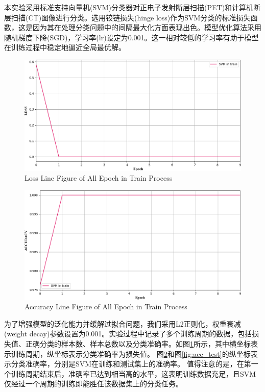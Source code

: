 \documentclass[twocolumn]{article}
\begin{document}
本实验采用标准支持向量机(SVM)分类器对正电子发射断层扫描(PET)和计算机断层扫描(CT)图像进行分类。选用铰链损失(hinge loss)作为SVM分类的标准损失函数，这是因为其在处理分类问题中的间隔最大化方面表现出色。模型优化算法采用随机梯度下降(SGD)，学习率(lr)设定为0.001。这一相对较低的学习率有助于模型在训练过程中稳定地逼近全局最优解。

\begin{figure}[h]
    \centering
    \includegraphics[width=1.0\linewidth]{exp_log/train440_valid024/LOSS_train}
    \caption[loss_train]{Loss Line Figure of All Epoch in Train Process}
    \label{fig:loss_train}
\end{figure}

\begin{figure}[h]
    \centering
    \includegraphics[width=1.0\linewidth]{exp_log/train440_valid024/ACCURACY_train}
    \caption[acc_train]{Accuracy Line Figure of All Epoch in Train Process}
    \label{fig:acc_train}
\end{figure}

为了增强模型的泛化能力并缓解过拟合问题，我们采用L2正则化，权重衰减(weight decay)参数设置为0.001。实验过程中记录了多个训练周期的数据，包括损失值、正确分类的样本数、样本总数以及分类准确率。如图\ref{fig:loss_train}所示，其中横坐标表示训练周期，纵坐标表示分类准确率为损失值。
图\ref{fig:acc_train}和图\ref{fig:acc_test}的纵坐标表示分类准确率，分别是SVM在训练和测试集上的准确率。
值得注意的是，在第一个训练周期结束后，准确率已达到相当高的水平，这表明训练数据充足，且SVM仅经过一个周期的训练即能胜任该数据集上的分类任务。
\end{document}
